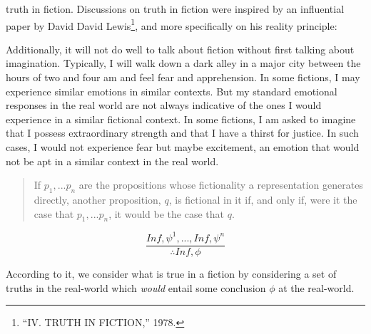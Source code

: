 \documentclass[phdthesis,12pt,final]{wuthesis}
\theoremstyle{definition}
\theoremstyle{definition}
\theoremstyle{definition}
\theoremstyle{definition}
\theoremstyle{remark}
\begin{document}
truth in fiction. Discussions on truth in fiction were inspired by an influential paper by David David Lewis\footnote{{``{IV}. {TRUTH IN FICTION},''} 1978.}, and more specifically on his reality principle:

Additionally, it will not do well to talk about fiction without first talking about imagination. Typically, I will walk down a dark alley in a major city between the hours of two and four am and feel fear and apprehension. In some fictions, I may experience similar emotions in similar contexts. But my standard emotional responses in the real world are not always indicative of the ones I would experience in a similar fictional context. In some fictions, I am asked to imagine that I possess extraordinary strength and that I have a thirst for justice. In such cases, I would not experience fear but maybe excitement, an emotion that would not be apt in a similar context in the real world.

\begin{quote}
If \(p_{1}, . . . p_{n}\) are the propositions whose fictionality a representation generates directly, another proposition, \(q\), is fictional in it if, and only if, were it the case that \(p_{1}, . . . p_{n}\), it would be the case that \(q\).
\end{quote}

\[\frac{In f, \psi^{1}, . . ., In f, \psi^{n}}{\therefore In f, \phi}\]

According to it, we consider what is true in a fiction by considering a set of truths in the real-world which \emph{would} entail some conclusion \(\phi\) at the real-world.

\end{document}
